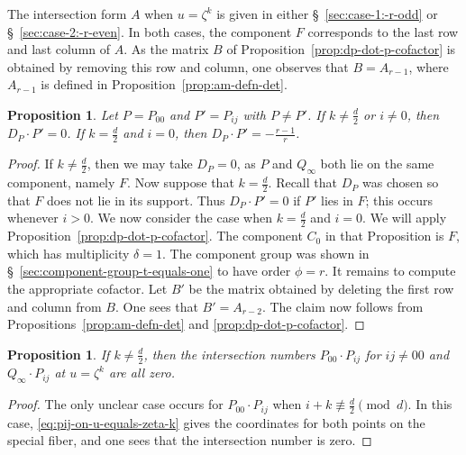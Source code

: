 \documentclass[reqno]{amsart}
\newtheorem{proposition}[thm]{Proposition}
\theoremstyle{definition}
\theoremstyle{remark}
\begin{document}
The intersection form $A$ when $u = \zeta^k$ is given in either \S~\ref{sec:case-1:-r-odd} or \S~\ref{sec:case-2:-r-even}. In both cases, the component $F$ corresponds to the last row and last column of $A$. As the matrix $B$ of Proposition~\ref{prop:dp-dot-p-cofactor} is obtained by removing this row and column, one observes that $B = A_{r-1}$, where $A_{r-1}$ is defined in Proposition~\ref{prop:am-defn-det}.

\begin{proposition}\label{prop:dp-u-zeta-k}
  Let $P = P_{00}$ and $P' = P_{ij}$ with $P \neq P'$. If $k \neq \frac{d}{2}$ or $i \neq 0$, then $D_P \cdot P' = 0$. If $k = \frac{d}{2}$ and $i = 0$, then $D_P \cdot P' = -\frac{r-1}{r}$.
\end{proposition}

\begin{proof}
  If $k \neq \frac{d}{2}$, then we may take $D_P = 0$, as $P$ and $Q_\infty$ both lie on the same component, namely $F$. Now suppose that $k = \frac{d}{2}$. Recall that $D_P$ was chosen so that $F$ does not lie in its support. Thus $D_P \cdot P' = 0$ if $P'$ lies in $F$; this occurs whenever $i > 0$. We now consider the case when $k = \frac{d}{2}$ and $i = 0$. We will apply Proposition~\ref{prop:dp-dot-p-cofactor}. The component $C_0$ in that Proposition is $F$, which has multiplicity $\delta = 1$. The component group was shown in \S~\ref{sec:component-group-t-equals-one} to have order $\phi = r$. It remains to compute the appropriate cofactor. Let $B'$ be the matrix obtained by deleting the first row and column from $B$. One sees that $B' = A_{r-2}$. The claim now follows from Propositions~\ref{prop:am-defn-det} and \ref{prop:dp-dot-p-cofactor}.
\end{proof}

\begin{proposition}\label{prop:local-intersections-u-zeta-k}
  If $k \neq \frac{d}{2}$, then the intersection numbers $P_{00} \cdot P_{ij}$ for $ij \neq 00$ and $Q_{\infty} \cdot P_{ij}$ at $u = \zeta^k$ are all zero.
\end{proposition} 

\begin{proof}
  The only unclear case occurs for $P_{00} \cdot P_{ij}$ when $i + k \not\equiv \frac{d}{2} \pmod{d}$. In this case, \eqref{eq:pij-on-u-equals-zeta-k} gives the coordinates for both points on the special fiber, and one sees that the intersection number is zero.
\end{proof}
\end{document}

